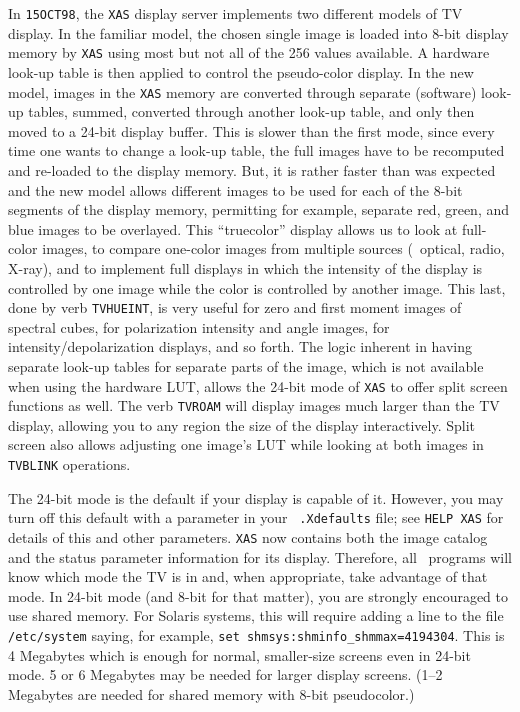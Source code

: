 In {\tt 15OCT98}, the {\tt XAS} display server implements two
different models of TV display.  In the familiar model, the chosen
single image is loaded into 8-bit display memory by {\tt XAS} using
most but not all of the 256 values available.  A hardware look-up
table is then applied to control the pseudo-color display.  In the new
model, images in the {\tt XAS} memory are converted through separate
(software) look-up tables, summed, converted through another look-up
table, and only then moved to a 24-bit display buffer.  This is slower
than the first mode, since every time one wants to change a look-up
table, the full images have to be recomputed and re-loaded to the
display memory.  But, it is rather faster than was expected and the
new model allows different images to be used for each of the 8-bit
segments of the display memory, permitting for example, separate red,
green, and blue images to be overlayed.  This ``truecolor'' display
allows us to look at full-color images, to compare one-color images
from multiple sources (\eg\ optical, radio, X-ray), and to implement
full displays in which the intensity of the display is controlled by
one image while the color is controlled by another image.  This last,
done by verb {\tt TVHUEINT}, is very useful for zero and first moment
images of spectral cubes, for polarization intensity and angle images,
for intensity/depolarization displays, and so forth.  The logic
inherent in having separate look-up tables for separate parts of the
image, which is not available when using the hardware LUT, allows the
24-bit mode of {\tt XAS} to offer split screen functions as well.  The
verb {\tt TVROAM} will display images much larger than the TV display,
allowing you to any region the size of the display interactively.
Split screen also allows adjusting one image's LUT while looking at
both images in {\tt TVBLINK} operations.

The 24-bit mode is the default if your display is capable of it.
However, you may turn off this default with a parameter in your {\tt
.Xdefaults} file; see {\tt HELP XAS} for details of this and other
parameters.  {\tt XAS} now contains both the image catalog and the
status parameter information for its display.  Therefore, all \AIPS\
programs will know which mode the TV is in and, when appropriate, take
advantage of that mode.  In 24-bit mode (and 8-bit for that matter),
you are strongly encouraged to use shared memory.  For Solaris
systems, this will require adding a line to the file {\tt /etc/system}
saying, for example, {\tt set shmsys:shminfo\_shmmax=4194304}.  This is
4 Megabytes which is enough for normal, smaller-size screens even in
24-bit mode. 5 or 6 Megabytes may be needed for larger display
screens.  (1--2 Megabytes are needed for shared memory with 8-bit
pseudocolor.)
\eject

